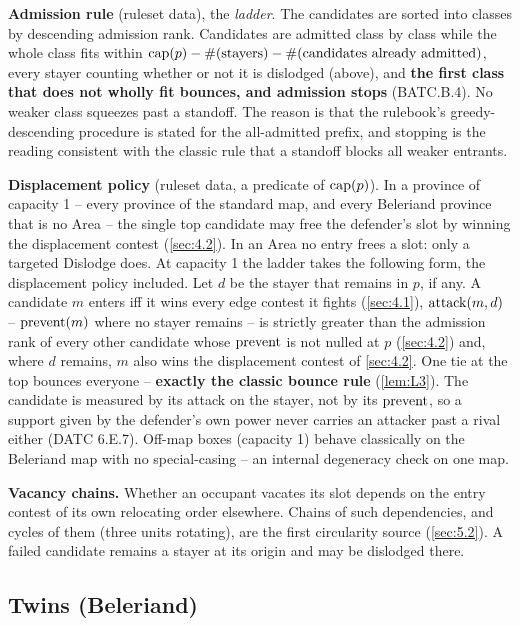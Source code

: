 \documentclass[12pt,a4paper]{article}
\begin{document}
\textbf{Admission rule} (ruleset data), the \emph{ladder}.
The candidates are sorted into classes by descending admission rank.
Candidates are admitted class by class while the whole class fits within $\operatorname{cap}(p) - \#(\text{stayers}) - \#(\text{candidates already admitted})$, every stayer counting whether or not it is dislodged (above), and \textbf{the first class that does not wholly fit bounces, and admission stops} (BATC.B.4).
No weaker class squeezes past a standoff.
The reason is that the rulebook's greedy-descending procedure is stated for the all-admitted prefix, and stopping is the reading consistent with the classic rule that a standoff blocks all weaker entrants.

\textbf{Displacement policy} (ruleset data, a predicate of $\operatorname{cap}(p)$).
In a province of capacity 1 -- every province of the standard map, and every Beleriand province that is no Area -- the single top candidate may free the defender's slot by winning the displacement contest (\cref{sec:4.2}).
In an Area no entry frees a slot: only a targeted Dislodge does.
At capacity 1 the ladder takes the following form, the displacement policy included.
Let $d$ be the stayer that remains in $p$, if any.
A candidate $m$ enters iff it wins every edge contest it fights (\cref{sec:4.1}), $\operatorname{attack}(m, d)$ -- $\operatorname{prevent}(m)$ where no stayer remains -- is strictly greater than the admission rank of every other candidate whose $\operatorname{prevent}$ is not nulled at $p$ (\cref{sec:4.2}) and, where $d$ remains, $m$ also wins the displacement contest of \cref{sec:4.2}.
One tie at the top bounces everyone -- \textbf{exactly the classic bounce rule} (\cref{lem:L3}).
The candidate is measured by its attack on the stayer, not by its $\operatorname{prevent}$, so a support given by the defender's own power never carries an attacker past a rival either (DATC 6.E.7).
Off-map boxes (capacity 1) behave classically on the Beleriand map with no special-casing -- an internal degeneracy check on one map.

\textbf{Vacancy chains.}
Whether an occupant vacates its slot depends on the entry contest of its own relocating order elsewhere.
Chains of such dependencies, and cycles of them (three units rotating), are the first circularity source (\cref{sec:5.2}).
A failed candidate remains a stayer at its origin and may be dislodged there.

\subsection{Twins (Beleriand)}\label{sec:4.4}
\end{document}
